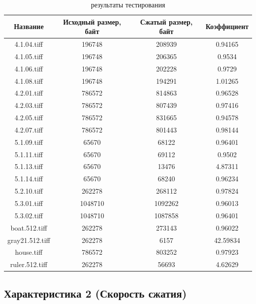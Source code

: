 \documentclass[a4paper,oneside]{article}
\theoremstyle{definition}
\begin{document}
\begin{table}[H]
  \small
  \centering
  \begin{tabular}{|c|c|c|c|}
    \hline
    Название     & Исходный размер, байт & Сжатый размер, байт & Коэффициент \\ \hline \hline
    4.1.04.tiff     &  196748 &  208939 & 0.94165 \\ \hline
    4.1.05.tiff     &  196748 &  206365 & 0.9534  \\ \hline
    4.1.06.tiff     &  196748 &  202228 & 0.9729  \\ \hline
    4.1.08.tiff     &  196748 &  194291 & 1.01265 \\ \hline
    4.2.01.tiff     &  786572 &  814863 & 0.96528 \\ \hline
    4.2.03.tiff     &  786572 &  807439 & 0.97416 \\ \hline
    4.2.05.tiff     &  786572 &  831665 & 0.94578 \\ \hline
    4.2.07.tiff     &  786572 &  801443 & 0.98144 \\ \hline
    5.1.09.tiff     &   65670 &   68122 & 0.96401 \\ \hline
    5.1.11.tiff     &   65670 &   69112 & 0.9502  \\ \hline
    5.1.13.tiff     &   65670 &   13476 & 4.87311 \\ \hline
    5.1.14.tiff     &   65670 &   68240 & 0.96234 \\ \hline
    5.2.10.tiff     &  262278 &  268112 & 0.97824 \\ \hline
    5.3.01.tiff     & 1048710 & 1092262 & 0.96013 \\ \hline
    5.3.02.tiff     & 1048710 & 1087858 & 0.96401 \\ \hline
    boat.512.tiff   &  262278 &  273143 & 0.96022 \\ \hline
    gray21.512.tiff &  262278 &    6157 & 42.59834 \\ \hline
    house.tiff      &  786572 &  803252 & 0.97923 \\ \hline
    ruler.512.tiff  &  262278 &   56693 & 4.62629 \\ \hline
  \end{tabular}
  \caption{результаты тестирования}
  \label{tbl:results}
\end{table}

\subsection{Характеристика 2 (Скорость сжатия)}
\end{document}
